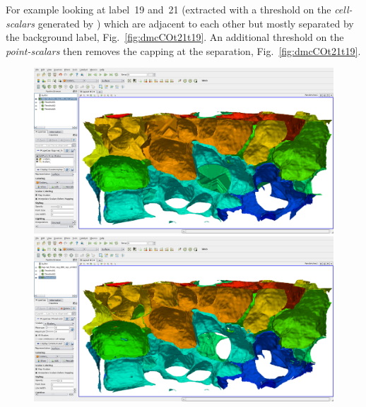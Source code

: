\documentclass{InsightArticle}
\begin{document}
For example looking at label~19 and~21 (extracted with a threshold on the \emph{cell-scalars} generated by ) which are adjacent to each other but mostly separated by the background label, Fig.~\ref{fig:dmcCOt21t19}.
An additional threshold on the \emph{point-scalars} then removes the capping at the separation, Fig.~\ref{fig:dmcCOt21t19}.

\begin{figure}[p]
\center
\includegraphics[width=.48\textwidth]{images/vtkDiscreteMarchingCubes_extension_01}
\hfill
\includegraphics[width=.48\textwidth]{images/vtkDiscreteMarchingCubes_extension_02}
\label{fig:dmcCO}
\end{figure}
\end{document}
